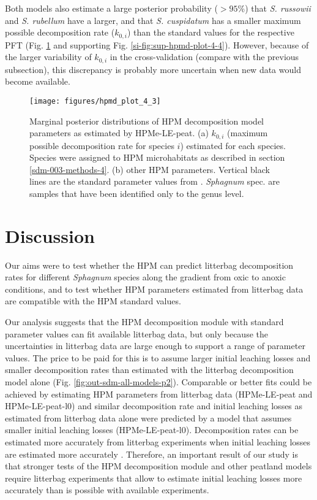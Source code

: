 \documentclass[esd, manuscript]{copernicus}
\begin{document}
Both models also estimate a large posterior probability (\(>95\)\%) that \emph{S. russowii} and \emph{S. rubellum} have a larger, and that \emph{S. cuspidatum} has a smaller maximum possible decomposition rate (\(k_{0,i}\)) than the standard values for the respective PFT (Fig. \ref{fig:out-mm30-hpm-test-p2} and supporting Fig. \ref{si-fig:sup-hpmd-plot-4-4}). However, because of the larger variability of \(k_{0,i}\) in the cross-validation (compare with the previous subsection), this discrepancy is probably more uncertain when new data would become available.



\begin{figure}[H]

{\centering \texttt{[image: figures/hpmd\_plot\_4\_3]} 

}

\caption{Marginal posterior distributions of HPM decomposition model parameters as estimated by HPMe-LE-peat. (a) \(k_{0,i}\) (maximum possible decomposition rate for species \(i\)) estimated for each species. Species were assigned to HPM microhabitats as described in section \ref{sdm-003-methods-4}. (b) other HPM parameters. Vertical black lines are the standard parameter values from \citet{Frolking.2010}. \emph{Sphagnum} spec. are samples that have been identified only to the genus level.}\label{fig:out-mm30-hpm-test-p2}
\end{figure}

\section{Discussion}

Our aims were to test whether the HPM can predict litterbag decomposition rates for different \emph{Sphagnum} species along the gradient from oxic to anoxic conditions, and to test whether HPM parameters estimated from litterbag data are compatible with the HPM standard values.

Our analysis suggests that the HPM decomposition module with standard parameter values can fit available litterbag data, but only because the uncertainties in litterbag data are large enough to support a range of parameter values. The price to be paid for this is to assume larger initial leaching losses and smaller decomposition rates than estimated with the litterbag decomposition model alone \citep{Teickner.2024f} (Fig. \ref{fig:out-sdm-all-models-p2}). Comparable or better fits could be achieved by estimating HPM parameters from litterbag data (HPMe-LE-peat and HPMe-LE-peat-l0) and similar decomposition rate and initial leaching losses as estimated from litterbag data alone were predicted by a model that assumes smaller initial leaching losses (HPMe-LE-peat-l0). Decomposition rates can be estimated more accurately from litterbag experiments when initial leaching losses are estimated more accurately \citep{Teickner.2024f}. Therefore, an important result of our study is that stronger tests of the HPM decomposition module and other peatland models require litterbag experiments that allow to estimate initial leaching losses more accurately than is possible with available experiments.
\end{document}
